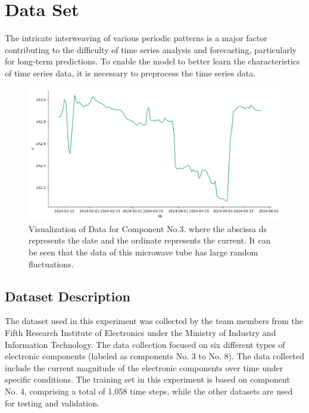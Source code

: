 \section{Data Set}
\label{sec:dataset}

The intricate interweaving of various periodic patterns is a major factor contributing to the difficulty of time series analysis and forecasting, particularly for long-term predictions. To enable the model to better learn the characteristics of time series data, it is necessary to preprocess the time series data.


\begin{figure}[H]
	\centering
	\includegraphics[width=\linewidth]{figures/No.3data} 
	
	
	
	\caption{Visualization of Data for Component No.3. where the abscissa ds represents the date and the ordinate represents the current. It can be seen that the data of this microwave tube has large random fluctuations.}
	\label{fig:No3_original}
\end{figure}


\subsection{Dataset Description}

The dataset used in this experiment was collected by the team members from the Fifth Research Institute of Electronics under the Ministry of Industry and Information Technology. The data collection focused on six different types of electronic components (labeled as components No. 3 to No. 8). The data collected include the current magnitude of the electronic components over time under specific conditions. The training set in this experiment is based on component No. 4, comprising a total of 1,058 time steps, while the other datasets are used for testing and validation.

